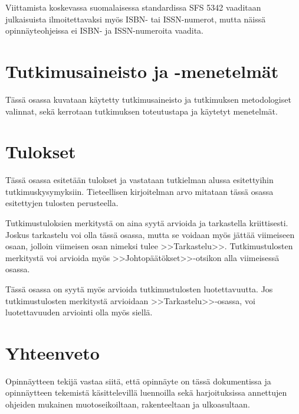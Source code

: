 \documentclass[finnish, 12pt, a4paper, sci, utf8, pdfa]{aaltothesis}
\begin{document}
Viittamista koskevassa suomalaisessa standardissa
SFS 5342 \cite{sfs} vaaditaan julkaisuista ilmoitettavaksi myös ISBN- tai
ISSN-numerot, mutta näissä opinnäyteohjeissa ei ISBN- ja 
ISSN-numeroita vaadita. 

\clearpage

\section{Tutkimusaineisto ja -menetelmät}

Tässä osassa kuvataan käytetty tutkimusaineisto ja tutkimuksen metodologiset
valinnat, sekä kerrotaan tutkimuksen toteutustapa ja käytetyt menetelmät.

\clearpage

\section{Tulokset}

Tässä osassa esitetään tulokset ja vastataan tutkielman alussa
esitettyihin tutkimuskysymyksiin. Tieteellisen kirjoitelman
arvo mitataan tässä osassa esitettyjen tulosten perusteella. 

Tutkimustuloksien merkitystä on aina syytä arvioida ja tarkastella
kriittisesti.  Joskus tarkastelu voi olla tässä osassa, mutta se
voidaan myös jättää viimeiseen osaan, jolloin viimeisen osan nimeksi
tulee >>Tarkastelu>>. Tutkimustulosten merkitystä voi arvioida myös
>>Johtopäätökset>>-otsikon alla viimeisessä osassa. 

Tässä osassa on syytä myös arvioida tutkimustulosten luotettavuutta.
Jos tutkimustulosten merkitystä arvioidaan >>Tarkastelu>>-osassa,
voi luotettavuuden arviointi olla myös siellä. 

\clearpage

\section{Yhteenveto}

Opinnäytteen tekijä vastaa siitä, että opinnäyte on tässä dokumentissa
ja opinnäytteen tekemistä käsittelevillä luennoilla sekä
harjoituksissa annettujen ohjeiden mukainen muotoseikoiltaan,
rakenteeltaan ja ulkoasultaan.
\end{document}
